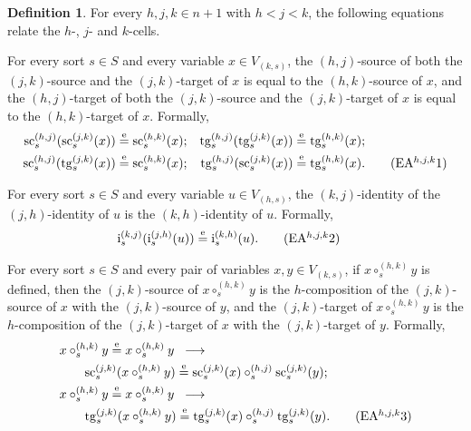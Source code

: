 \documentclass[a4paper, reqno]{amsbook}
\newcommand{\eeq}{\overset{\mathrm e}{=}}      %
\newcommand{\src}{\mathrm{sc}}
\newcommand{\tgt}{\mathrm{tg}}
\theoremstyle{plain}
\theoremstyle{definition}
\newtheorem{definition}[theorem]{Definition}
\begin{document}
\begin{definition}
For every $h,j,k\in n+1$ with $h<j<k$, the following equations relate the $h$-, $j$- and $k$-cells.

For every sort $s\in S$ and every variable $x\in V_{(k,s)}$, the $(h,j)$-source of both the $(j,k)$-source and the $(j,k)$-target of $x$ is equal to the $(h,k)$-source of $x$, and the $(h,j)$-target of both the $(j,k)$-source and the $(j,k)$-target of $x$ is equal to the $(h,k)$-target of $x$.
Formally,
\begin{align*}
\src^{(h,j)}_{s}(\src^{(j,k)}_{s}(x))&\eeq\src^{(h,k)}_{s}(x);
&
\tgt^{(h,j)}_{s}(\tgt^{(j,k)}_{s}(x))&\eeq\tgt^{(h,k)}_{s}(x);\\
\src^{(h,j)}_{s}(\tgt^{(j,k)}_{s}(x))&\eeq\src^{(h,k)}_{s}(x);
&
\tgt^{(h,j)}_{s}(\src^{(j,k)}_{s}(x))&\eeq\tgt^{(h,k)}_{s}(x).\label{ACatHtgEAhjk1}\tag{EA$^{h,j,k}$1}
\end{align*}

For every sort $s\in S$ and every variable $u\in V_{(h,s)}$, the $(k,j)$-identity of the $(j,h)$-identity of $u$ is the $(k,h)$-identity of $u$.
Formally,
\begin{align*}
\mathrm{i}^{(k,j)}_{s}(\mathrm{i}^{(j,h)}_{s}(u))&\eeq\mathrm{i}^{(k,h)}_{s}(u).\label{ACatHtgEAhjk2}\tag{EA$^{h,j,k}$2}
\end{align*}

For every sort $s\in S$ and every pair of variables $x,y\in V_{(k,s)}$, if $x\circ^{(h,k)}_{s}y$ is defined, then the $(j,k)$-source of $x\circ^{(h,k)}_{s}y$ is the $h$-composition of the $(j,k)$-source of $x$ with the $(j,k)$-source of $y$, and the $(j,k)$-target of $x\circ^{(h,k)}_{s}y$ is the $h$-composition of the $(j,k)$-target of $x$ with the $(j,k)$-target of $y$.
Formally,
\begin{align*}
&x\circ^{(h,k)}_{s}y\eeq x\circ^{(h,k)}_{s}y \;\;\longrightarrow\\
&\qquad\src^{(j,k)}_{s}(x\circ^{(h,k)}_{s}y)\eeq\src^{(j,k)}_{s}(x)\circ^{(h,j)}_{s}\src^{(j,k)}_{s}(y);\\
&x\circ^{(h,k)}_{s}y\eeq x\circ^{(h,k)}_{s}y \;\;\longrightarrow\\
&\qquad\tgt^{(j,k)}_{s}(x\circ^{(h,k)}_{s}y)\eeq\tgt^{(j,k)}_{s}(x)\circ^{(h,j)}_{s}\tgt^{(j,k)}_{s}(y).
\label{ACatHtgEAhjk3}\tag{EA$^{h,j,k}$3}
\end{align*}


\end{definition}
\end{document}
